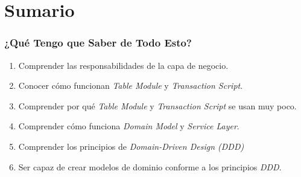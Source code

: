 \documentclass[handout,a4paper,slidestop,xcolor=pst,blue]{beamer}
\begin{document}
\section{Sumario}

\begin{frame}[c]
    \frametitle{¿Qué Tengo que Saber de Todo Esto?}
    \begin{enumerate}[<+->]
        \item Comprender las responsabilidades de la capa de negocio.
        \item Conocer cómo funcionan \emph{Table Module} y \emph{Transaction Script}.
        \item Comprender por qué \emph{Table Module} y \emph{Transaction Script} se usan muy poco.
        \item Comprender cómo funciona \emph{Domain Model} y \emph{Service Layer}.
        \item Comprender los principios de \emph{Domain-Driven Design (DDD)}
        \item Ser capaz de crear modelos de dominio conforme a los principios \emph{DDD}.
    \end{enumerate}
\end{frame}
\end{document}

